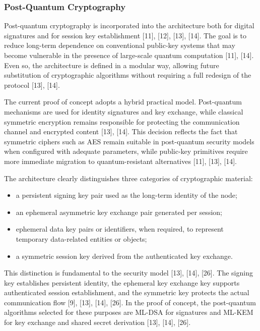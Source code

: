 \documentclass[12pt,a4paper]{article}
\begin{document}
\subsubsection{Post-Quantum Cryptography}

Post-quantum cryptography is incorporated into the architecture both for digital signatures and for session key establishment [11], [12], [13], [14]. The goal is to reduce long-term dependence on conventional public-key systems that may become vulnerable in the presence of large-scale quantum computation [11], [14]. Even so, the architecture is defined in a modular way, allowing future substitution of cryptographic algorithms without requiring a full redesign of the protocol [13], [14].

The current proof of concept adopts a hybrid practical model. Post-quantum mechanisms are used for identity signatures and key exchange, while classical symmetric encryption remains responsible for protecting the communication channel and encrypted content [13], [14]. This decision reflects the fact that symmetric ciphers such as AES remain suitable in post-quantum security models when configured with adequate parameters, while public-key primitives require more immediate migration to quantum-resistant alternatives [11], [13], [14].

The architecture clearly distinguishes three categories of cryptographic material:

\begin{itemize}
    \item a persistent signing key pair used as the long-term identity of the node;
    \item an ephemeral asymmetric key exchange pair generated per session;
    \item ephemeral data key pairs or identifiers, when required, to represent temporary data-related entities or objects;
    \item a symmetric session key derived from the authenticated key exchange.
\end{itemize}

This distinction is fundamental to the security model [13], [14], [26]. The signing key establishes persistent identity, the ephemeral key exchange key supports authenticated session establishment, and the symmetric key protects the actual communication flow [9], [13], [14], [26]. In the proof of concept, the post-quantum algorithms selected for these purposes are ML-DSA for signatures and ML-KEM for key exchange and shared secret derivation [13], [14], [26].
\end{document}
